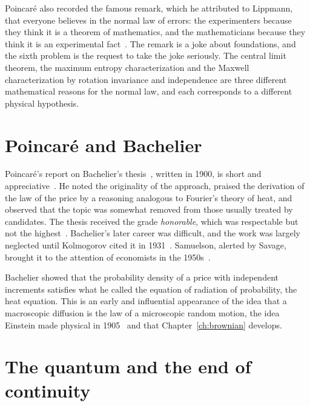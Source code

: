 Poincar\'e also recorded the famous remark, which he attributed to Lippmann, that everyone believes in the normal law of errors: the experimenters because they think it is a theorem of mathematics, and the mathematicians because they think it is an experimental fact~\cite{poincare1912calcul}. The remark is a joke about foundations, and the sixth problem is the request to take the joke seriously. The central limit theorem, the maximum entropy characterization and the Maxwell characterization by rotation invariance and independence are three different mathematical reasons for the normal law, and each corresponds to a different physical hypothesis.

\section{Poincar\'e and Bachelier}

Poincar\'e's report on Bachelier's thesis~\cite{bachelier1900}, written in 1900, is short and appreciative~\cite{courtault2000}. He noted the originality of the approach, praised the derivation of the law of the price by a reasoning analogous to Fourier's theory of heat, and observed that the topic was somewhat removed from those usually treated by candidates. The thesis received the grade \emph{honorable}, which was respectable but not the highest~\cite{taqqu2001}. Bachelier's later career was difficult, and the work was largely neglected until Kolmogorov cited it in 1931~\cite{kolmogorov1931}. Samuelson, alerted by Savage, brought it to the attention of economists in the 1950s~\cite{taqqu2001}.

Bachelier showed that the probability density of a price with independent increments satisfies what he called the equation of radiation of probability, the heat equation. This is an early and influential appearance of the idea that a macroscopic diffusion is the law of a microscopic random motion, the idea Einstein made physical in 1905~\cite{einstein1905} and that Chapter~\ref{ch:brownian} develops.

\section{The quantum and the end of continuity}

